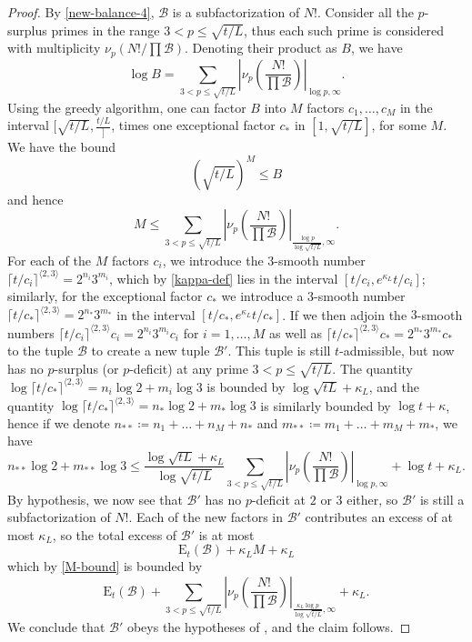 \documentclass[12pt,a4paper,reqno]{amsart}
\numberwithin{equation}{section}
\theoremstyle{plain}
\theoremstyle{definition}
\newcommand\tuple{{\mathcal B}}
\newcommand\excess{{\mathrm{E}}}
\begin{document}
\begin{proof} By \eqref{new-balance-4}, $\tuple$ is a subfactorization of $N!$. Consider all the $p$-surplus primes in the range $3 < p \leq \sqrt{t/L}$, thus each such prime is considered with multiplicity $\nu_p(N!/\prod \tuple)$.  Denoting their product as $B$, we have
  $$ \log B = \sum_{3 < p \leq \sqrt{t/L}}
  \left|\nu_p\left(\frac{N!}{\prod \tuple}\right)\right|_{\log p,\infty}.$$
Using the greedy algorithm, one can factor $B$ into $M$ factors $c_1,\dots,c_M$ in the interval $[\sqrt{t/L}, \frac{t/L}]$, times one exceptional factor $c_*$ in $[1,\sqrt{t/L}]$, for some $M$.  We have the bound
$$ (\sqrt{t/L})^M \leq B$$
and hence
\begin{equation}\label{M-bound}  M \leq \sum_{3 < p \leq \sqrt{t/L}}
\left|\nu_p\left(\frac{N!}{\prod \tuple}\right)\right|_{\frac{\log p}{\log\sqrt{t/L}},\infty}. \end{equation}
For each of the $M$ factors $c_i$, we introduce the $3$-smooth number $\lceil t/c_i\rceil^{\langle 2,3\rangle} = 2^{n_i} 3^{m_i}$, which by \eqref{kappa-def} lies in the interval $[t/c_i,e^{\kappa_L} t/c_i]$; similarly, for the exceptional factor $c_*$ we introduce a $3$-smooth number $\lceil t/c_* \rceil^{\langle 2,3 \rangle} = 2^{n_*} 3^{m_*}$ in the interval $[t/c_*,e^{\kappa_L} t/c_*]$.  If we then adjoin the $3$-smooth numbers $\lceil t/c_i\rceil^{\langle 2,3\rangle} c_i = 2^{n_i} 3^{m_i} c_i$ for $i=1,\dots,M$ as well as $\lceil t/c_*\rceil^{\langle 2,3\rangle} c_* = 2^{n_*} 3^{m_*} c_*$ to the tuple $\tuple$ to create a new tuple $\tuple'$.  This tuple is still $t$-admissible, but now has no $p$-surplus (or $p$-deficit) at any prime $3 < p \leq \sqrt{t/L}$.  The quantity $\log \lceil t/c_*\rceil^{\langle 2,3\rangle} = n_i \log 2 + m_i \log 3$ is bounded by $\log \sqrt{tL} + \kappa_L$, and the quantity $\log \lceil t/c_*\rceil^{\langle 2,3\rangle}  = n_* \log 2 + m_* \log 3$ is similarly bounded by $\log t + \kappa$, hence if we denote $n_{**} \coloneqq n_1 + \dots + n_M + n_*$ and $m_{**} \coloneqq m_1 + \dots + m_M + m_*$, we have
$$ n_{**} \log 2 + m_{**} \log 3 \leq 
\frac{\log \sqrt{tL} + \kappa_L}{\log\sqrt{t/L}}
\sum_{3 < p \leq \sqrt{t/L}}
\left|\nu_p\left(\frac{N!}{\prod \tuple}\right)\right|_{\log p,\infty}
+ \log t + \kappa_L.$$
By hypothesis, we now see that $\tuple'$ has no $p$-deficit at $2$ or $3$ either, so $\tuple'$ is still a subfactorization of $N!$.  Each of the new factors in $\tuple'$ contributes an excess of at most $\kappa_L$, so the total excess of $\tuple'$ is at most
$$ \excess_t(\tuple) + \kappa_L M + \kappa_L$$
which by \eqref{M-bound} is bounded by
$$ \excess_t(\tuple) + \sum_{3 < p \leq \sqrt{t/L}}
\left|\nu_p\left(\frac{N!}{\prod \tuple}\right)\right|_{\frac{\kappa_L \log p}{\log\sqrt{t/L}},\infty} + \kappa_L.$$
We conclude that $\tuple'$ obeys the hypotheses of , and the claim follows.
\end{proof}
\end{document}
